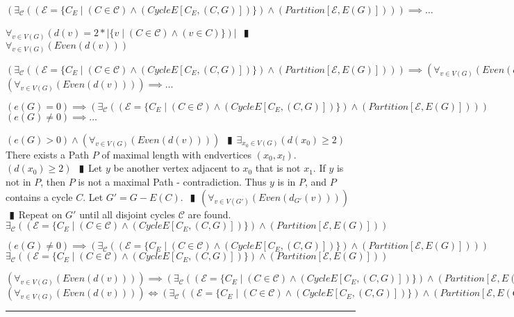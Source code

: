 \documentclass{book}
\newcommand{\pipe}{$\phantom{(}\vrectangleblack\phantom{)}$}
\newcommand{\pr}[1]{\left(#1\right)}
\newcommand{\st}{\mathbin{|}}
\begin{document}
\begin{enumerate}
  \lit $\pr{\exists_{\mathcal{C}}\pr{\pr{\mathcal{E} = \{C_E \st (C \in \mathcal{C}) \land \pr{CycleE[C_E, (C, G)]}\}} \land \pr{Partition[\mathcal{E}, E(G)]}}} \implies \ldots$
  \begin{enumerate}
    \lit $\forall_{v \in V(G)}\pr{d(v) = 2 * |\{v \st (C \in \mathcal{C}) \land (v \in C)\}}|$ \pipe $\forall_{v \in V(G)}\pr{Even\pr{d(v)}}$
  \end{enumerate}
  \lit $\pr{\exists_{\mathcal{C}}\pr{\pr{\mathcal{E} = \{C_E \st (C \in \mathcal{C}) \land \pr{CycleE[C_E, (C, G)]}\}} \land \pr{Partition[\mathcal{E}, E(G)]}}} \implies \pr{\forall_{v \in V(G)}\pr{Even\pr{d(v)}}}$
  \lit $\pr{\forall_{v \in V(G)}\pr{Even\pr{d(v)}}} \implies \ldots$
  \begin{enumerate}
    \lit $\pr{e(G) = 0} \implies \pr{\exists_{\mathcal{C}}\pr{\pr{\mathcal{E} = \{C_E \st (C \in \mathcal{C}) \land \pr{CycleE[C_E, (C, G)]}\}} \land \pr{Partition[\mathcal{E}, E(G)]}}}$
    \lit $\pr{e(G) \neq 0} \implies \ldots$
    \begin{enumerate}
      \lit $\pr{e(G) > 0} \land \pr{\forall_{v \in V(G)}\pr{Even\pr{d(v)}}}$ \pipe $\exists_{x_0 \in V(G)}\pr{d(x_0) \geq 2}$
      \lit There exists a Path $P$ of maximal length with endvertices $(x_0, x_l)$.
      \lit $\pr{d(x_0) \geq 2}$ \pipe Let $y$ be another vertex adjacent to $x_0$ that is not $x_1$.
      \lit If $y$ is not in $P$, then $P$ is not a maximal Path - contradiction.
      \lit Thus $y$ is in $P$, and $P$ contains a cycle $C$.
      \lit Let $G' = G - E(C)$. \pipe $\pr{\forall_{v \in V(G')}\pr{Even\pr{d_{G'}(v)}}}$ \pipe Repeat on $G'$ until all disjoint cycles $\mathcal{C}$ are found.
      \lit $\exists_{\mathcal{C}}\pr{\pr{\mathcal{E} = \{C_E \st (C \in \mathcal{C}) \land \pr{CycleE[C_E, (C, G)]}\}} \land \pr{Partition[\mathcal{E}, E(G)]}}$
    \end{enumerate}
    \lit $\pr{e(G) \neq 0} \implies \pr{\exists_{\mathcal{C}}\pr{\pr{\mathcal{E} = \{C_E \st (C \in \mathcal{C}) \land \pr{CycleE[C_E, (C, G)]}\}} \land \pr{Partition[\mathcal{E}, E(G)]}}}$
    \lit $\exists_{\mathcal{C}}\pr{\pr{\mathcal{E} = \{C_E \st (C \in \mathcal{C}) \land \pr{CycleE[C_E, (C, G)]}\}} \land \pr{Partition[\mathcal{E}, E(G)]}}$
  \end{enumerate}
  \lit $\pr{\forall_{v \in V(G)}\pr{Even\pr{d(v)}}} \implies \pr{\exists_{\mathcal{C}}\pr{\pr{\mathcal{E} = \{C_E \st (C \in \mathcal{C}) \land \pr{CycleE[C_E, (C, G)]}\}} \land \pr{Partition[\mathcal{E}, E(G)]}}}$
  \lit $\pr{\forall_{v \in V(G)}\pr{Even\pr{d(v)}}} \iff \pr{\exists_{\mathcal{C}}\pr{\pr{\mathcal{E} = \{C_E \st (C \in \mathcal{C}) \land \pr{CycleE[C_E, (C, G)]}\}} \land \pr{Partition[\mathcal{E}, E(G)]}}}$
\end{enumerate} \vspace{.75mm} \hrule \vspace{.75mm} \ \\
\end{document}
